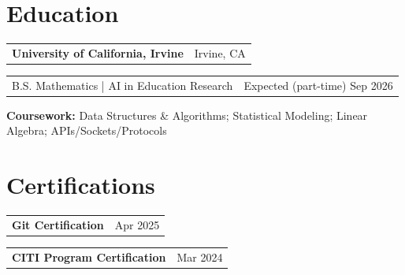 \documentclass[11pt]{article}
\makeatletter
\newcommand{\twocol}[2]{%
  \noindent\begin{tabularx}{\textwidth}{@{}X r@{}}
    #1 & #2 \\
  \end{tabularx}\par
}
\makeatother
\begin{document}
\section{Education}
\twocol{\textbf{University of California, Irvine}}{\textcolor{meta}{Irvine, CA}}
\twocol{B.S. Mathematics \textcolor{meta}{\;|\;} AI in Education Research}{\textcolor{meta}{Expected (part-time) Sep 2026}}
\textbf{Coursework:} Data Structures \& Algorithms; Statistical Modeling; Linear Algebra; APIs/Sockets/Protocols

\section{Certifications}
\twocol{\textbf{Git Certification}}{\textcolor{meta}{Apr 2025}}
\twocol{\textbf{CITI Program Certification}}{\textcolor{meta}{Mar 2024}}
\end{document}
